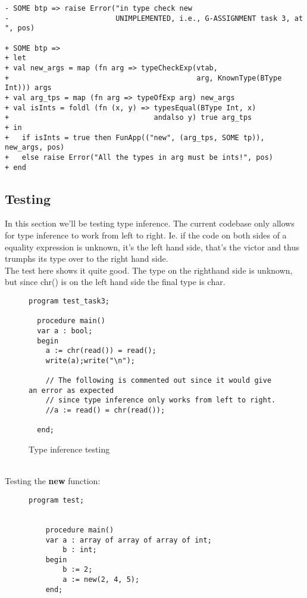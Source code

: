 \begin{lstlisting}[style=MLStyle]
- SOME btp => raise Error("in type check new 
-                         UNIMPLEMENTED, i.e., G-ASSIGNMENT task 3, at ", pos)

+ SOME btp => 
+ let
+ val new_args = map (fn arg => typeCheckExp(vtab,
+                                            arg, KnownType(BType Int))) args
+ val arg_tps = map (fn arg => typeOfExp arg) new_args
+ val isInts = foldl (fn (x, y) => typesEqual(BType Int, x) 
+                                  andalso y) true arg_tps 
+ in
+   if isInts = true then FunApp(("new", (arg_tps, SOME tp)), new_args, pos)
+   else raise Error("All the types in arg must be ints!", pos)
+ end
\end{lstlisting}
\subsection{Testing}
In this section we'll be testing type inference. The current codebase only
allows for type inference to work from left to right. Ie. if the code on both
sides of a equality expression is unknown, it's the left hand side, that's the
victor and thus trumphs its type over to the right hand side.\\
The test here shows it quite good. The type on the righthand side is unknown,
but since chr() is on the left hand side the final type is char.
\begin{figure}[H]
  \begin{lstlisting}[style=paladim]
  program test_task3;
  
  procedure main()
  var a : bool;
  begin
    a := chr(read()) = read();
    write(a);write("\n");
  
    // The following is commented out since it would give an error as expected
    // since type inference only works from left to right.
    //a := read() = chr(read());
  
  end;
  \end{lstlisting}
\caption{Type inference testing}
\end{figure}
\\
Testing the \textbf{new} function:
\begin{figure}[H]
  \begin{lstlisting}[style=paladim]
    program test;
    
    
    procedure main()
    var a : array of array of array of int;
        b : int;
    begin 
        b := 2;
        a := new(2, 4, 5);
    end;
  \end{lstlisting}
\end{figure}
